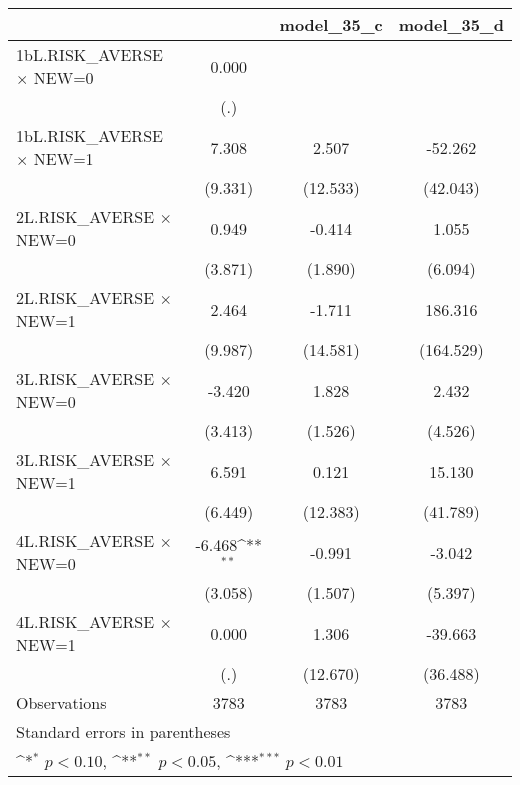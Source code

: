 {
\def\sym#1{\ifmmode^{#1}\else\(^{#1}\)\fi}
\begin{longtable}{l*{3}{c}}
\toprule\endfirsthead\midrule\endhead\midrule\endfoot\endlastfoot
                &\multicolumn{1}{c}{}&\multicolumn{1}{c}{model\_35\_c}&\multicolumn{1}{c}{model\_35\_d}\\
\midrule
1bL.RISK\_AVERSE $\times$ NEW=0&    0.000         &                  &                  \\
                &      (.)         &                  &                  \\
\addlinespace
1bL.RISK\_AVERSE $\times$ NEW=1&    7.308         &    2.507         &  -52.262         \\
                &  (9.331)         & (12.533)         & (42.043)         \\
\addlinespace
2L.RISK\_AVERSE $\times$ NEW=0&    0.949         &   -0.414         &    1.055         \\
                &  (3.871)         &  (1.890)         &  (6.094)         \\
\addlinespace
2L.RISK\_AVERSE $\times$ NEW=1&    2.464         &   -1.711         &  186.316         \\
                &  (9.987)         & (14.581)         &(164.529)         \\
\addlinespace
3L.RISK\_AVERSE $\times$ NEW=0&   -3.420         &    1.828         &    2.432         \\
                &  (3.413)         &  (1.526)         &  (4.526)         \\
\addlinespace
3L.RISK\_AVERSE $\times$ NEW=1&    6.591         &    0.121         &   15.130         \\
                &  (6.449)         & (12.383)         & (41.789)         \\
\addlinespace
4L.RISK\_AVERSE $\times$ NEW=0&   -6.468\sym{**} &   -0.991         &   -3.042         \\
                &  (3.058)         &  (1.507)         &  (5.397)         \\
\addlinespace
4L.RISK\_AVERSE $\times$ NEW=1&    0.000         &    1.306         &  -39.663         \\
                &      (.)         & (12.670)         & (36.488)         \\
\midrule
Observations    &     3783         &     3783         &     3783         \\
\bottomrule
\multicolumn{4}{l}{\footnotesize Standard errors in parentheses}\\
\multicolumn{4}{l}{\footnotesize \sym{*} \(p<0.10\), \sym{**} \(p<0.05\), \sym{***} \(p<0.01\)}\\
\end{longtable}
}
